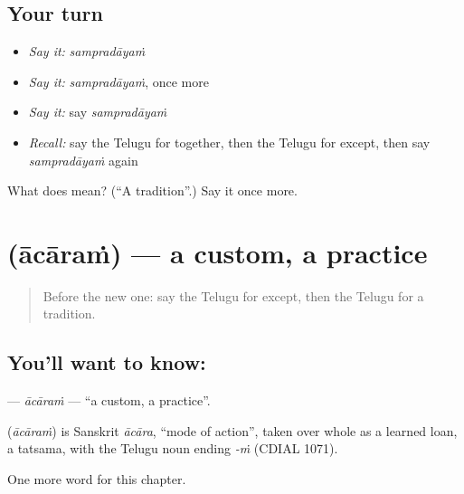 \subsection*{Your turn}
\begin{itemize}
\raggedright
  \item \emph{Say it:} \emph{sampradāyaṁ}
  \item \emph{Say it:} \emph{sampradāyaṁ}, once more
  \item \emph{Say it:} say \emph{sampradāyaṁ}
  \item \emph{Recall:} say the Telugu for together, then the Telugu for except, then say \emph{sampradāyaṁ} again
\end{itemize}

\begin{tcolorbox}[breakable,colback=teal!4,colframe=teal!35!black,title={Before you move on}]
What does  mean? (\textquotedblleft{}A tradition\textquotedblright{}.) Say it once more.
\end{tcolorbox}
\section[\texorpdfstring{\te{ఆచారం} (ācāraṁ)}{ఆచారం (ācāraṁ)}]{ (ācāraṁ) — a custom, a practice}

\label{lesson:TE-C217-acaram}



\begin{quote}
Before the new one: say the Telugu for except, then the Telugu for a tradition.
\end{quote}

\subsection*{You'll want to know: }
\textbf{} — \emph{ācāraṁ} — \textquotedblleft{}a custom, a practice\textquotedblright{}.

\begin{cousinweb}
\textbf{} (\emph{ācāraṁ}) is Sanskrit \emph{ācāra}, \textquotedblleft{}mode of action\textquotedblright{}, taken over whole as a learned loan, a tatsama, with the Telugu noun ending \emph{-ṁ} (CDIAL 1071).
\end{cousinweb}

\begin{grammarlens}[title={What you've built}]
One more word for this chapter.
\end{grammarlens}

